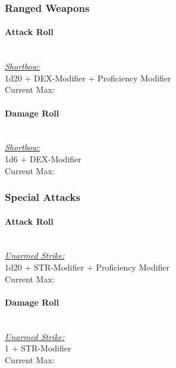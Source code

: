 \documentclass[letterpaper,openany,oneside,twocolumn]{book}
\begin{document}
\subsubsection*{Ranged Weapons}
\paragraph*{Attack Roll}\hfill\\
\underline{\textit{Shortbow:}}\\
1d20 + DEX-Modifier + Proficiency Modifier\\
\indent Current Max: 
\paragraph*{Damage Roll}\hfill\\
\underline{\textit{Shortbow:}}\\
1d6 + DEX-Modifier\\
\indent Current Max: 
\subsubsection*{Special Attacks}
\paragraph*{Attack Roll}\hfill\\
\underline{\textit{Unarmed Strike:}}\\
1d20 + STR-Modifier + Proficiency Modifier\\
\indent Current Max: 
\paragraph*{Damage Roll}\hfill\\
\underline{\textit{Unarmed Strike:}}\\
1 + STR-Modifier\\
\indent Current Max: 
\end{document}
